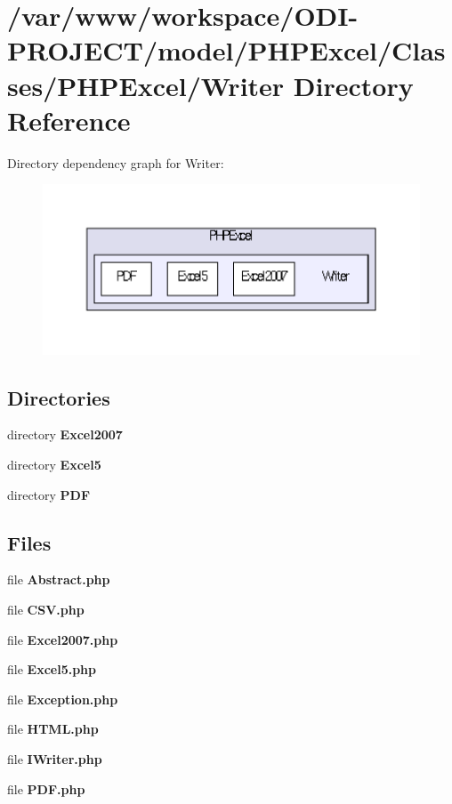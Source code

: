 \section{/var/www/workspace/\+O\+D\+I-\/\+P\+R\+O\+J\+E\+C\+T/model/\+P\+H\+P\+Excel/\+Classes/\+P\+H\+P\+Excel/\+Writer Directory Reference}
\label{dir_c9e1a9fb3334a713a6b3cda4cdbe7dd7}
Directory dependency graph for Writer\+:\nopagebreak
\begin{figure}[H]
\begin{center}
\leavevmode
\includegraphics[width=350pt]{dir_c9e1a9fb3334a713a6b3cda4cdbe7dd7_dep}
\end{center}
\end{figure}
\subsection*{Directories}
\begin{DoxyCompactItemize}
\item 
directory {\bf Excel2007}
\item 
directory {\bf Excel5}
\item 
directory {\bf P\+D\+F}
\end{DoxyCompactItemize}
\subsection*{Files}
\begin{DoxyCompactItemize}
\item 
file {\bfseries Abstract.\+php}
\item 
file {\bfseries C\+S\+V.\+php}
\item 
file {\bfseries Excel2007.\+php}
\item 
file {\bfseries Excel5.\+php}
\item 
file {\bfseries Exception.\+php}
\item 
file {\bfseries H\+T\+M\+L.\+php}
\item 
file {\bfseries I\+Writer.\+php}
\item 
file {\bfseries P\+D\+F.\+php}
\end{DoxyCompactItemize}
